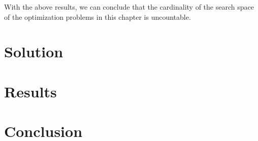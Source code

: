     With the above results, we can conclude that the cardinality of the
    search space of the optimization problems in this chapter is uncountable.

  \section{Solution}
  \label{sec:fn_opt:sol}
    \Blindtext
  \section{Results}
  \label{sec:fn_opt:results}
    \Blindtext
  \section{Conclusion}
  \label{sec:fn_opt:conclusion}
    \Blindtext
